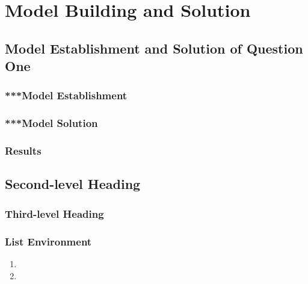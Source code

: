 \newpage	
\section{Model Building and Solution}

\subsection{Model Establishment and Solution of Question One}
\subsubsection{***Model Establishment}


\subsubsection{***Model Solution}


\subsubsection{Results}


\subsection{Second-level Heading}
\subsubsection{Third-level Heading}


\subsubsection{List Environment}
\begin{enumerate}
	\item 
	
	\item 	
\end{enumerate}


